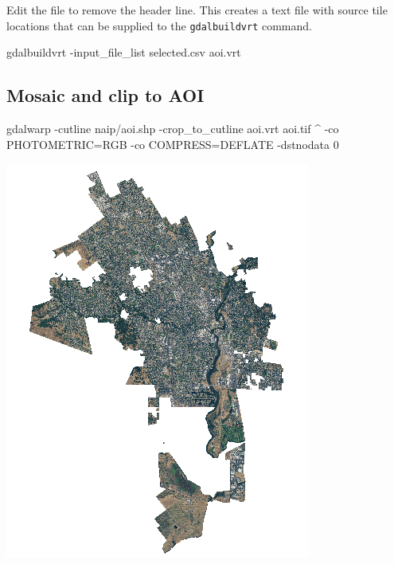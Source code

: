 \documentclass[12pt,a4paper]{article}
\newenvironment{Shaded}{\begin{snugshade}}{\end{snugshade}}
\newcommand{\ExtensionTok}[1]{#1}
\newcommand{\NormalTok}[1]{#1}
\begin{document}
Edit the file to remove the header line. This creates a text file with
source tile locations that can be supplied to the \texttt{gdalbuildvrt}
command.

\begin{Shaded}
\begin{Highlighting}[]
\ExtensionTok{gdalbuildvrt}\NormalTok{ -input_file_list selected.csv aoi.vrt}
\end{Highlighting}
\end{Shaded}

\hypertarget{mosaic-and-clip-to-aoi}{%
\subsection{Mosaic and clip to AOI}\label{mosaic-and-clip-to-aoi}}

\begin{Shaded}
\begin{Highlighting}[]
\ExtensionTok{gdalwarp}\NormalTok{ -cutline naip/aoi.shp  -crop_to_cutline aoi.vrt aoi.tif ^}
  \ExtensionTok{-co}\NormalTok{ PHOTOMETRIC=RGB -co COMPRESS=DEFLATE -dstnodata 0}
\end{Highlighting}
\end{Shaded}

\begin{center}\includegraphics{images/gdal/mosaic} \end{center}
\end{document}
